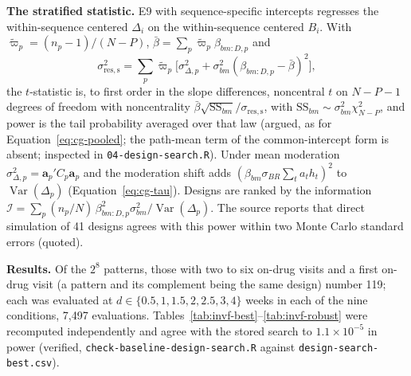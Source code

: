 \documentclass[11pt]{article}
\newcommand{\code}[1]{\texttt{#1}}
\begin{document}
\textbf{The stratified statistic.} E9 with sequence-specific intercepts
regresses the within-sequence centered $\Delta_i$ on the within-sequence
centered $B_i$. With $\tilde\varpi_p = (n_p - 1)/(N - P)$,
$\bar\beta = \sum_p \tilde\varpi_p\beta_{bm:D,p}$ and
\begin{equation}
\sigma^2_{\mathrm{res,s}} = \sum_p \tilde\varpi_p\big[\sigma_{\Delta,p}^2 +
  \sigma_{bm}^2(\beta_{bm:D,p} - \bar\beta)^2\big],
\label{eq:invf-strat}
\end{equation}
the $t$-statistic is, to first order in the slope differences,
noncentral $t$ on $N - P - 1$ degrees of freedom with noncentrality
$\bar\beta\sqrt{\mathrm{SS}_{bm}}/\sigma_{\mathrm{res,s}}$, with
$\mathrm{SS}_{bm} \sim \sigma_{bm}^2\chi^2_{N-P}$, and power is the tail
probability averaged over that law (argued, as for
Equation~\eqref{eq:cg-pooled}; the path-mean term of the common-intercept
form is absent; inspected in \code{04-design-search.R}). Under mean
moderation $\sigma_{\Delta,p}^2 = \mathbf a_p'C_p\mathbf a_p$ and the moderation
shift adds $(\beta_{bm}\sigma_{BR}\sum_t a_t h_t)^2$ to
$\operatorname{Var}(\Delta_p)$ (Equation~\eqref{eq:cg-tau}). Designs are
ranked by the information
$\mathcal I = \sum_p (n_p/N)\,\beta_{bm:D,p}^2\sigma_{bm}^2/
\operatorname{Var}(\Delta_p)$. The source reports that direct simulation
of 41 designs agrees with this power within two Monte Carlo standard
errors (quoted).

\textbf{Results.} Of the $2^8$ patterns, those with two to six on-drug
visits and a first on-drug visit (a pattern and its complement being the
same design) number 119; each was evaluated at $d \in \{0.5, 1, 1.5, 2,
2.5, 3, 4\}$ weeks in each of the nine conditions, 7,497 evaluations.
Tables~\ref{tab:invf-best}--\ref{tab:invf-robust} were recomputed
independently and agree with the stored search to $1.1\times10^{-5}$ in
power (verified, \code{check-baseline-design-search.R} against
\code{design-search-best.csv}).
\end{document}
